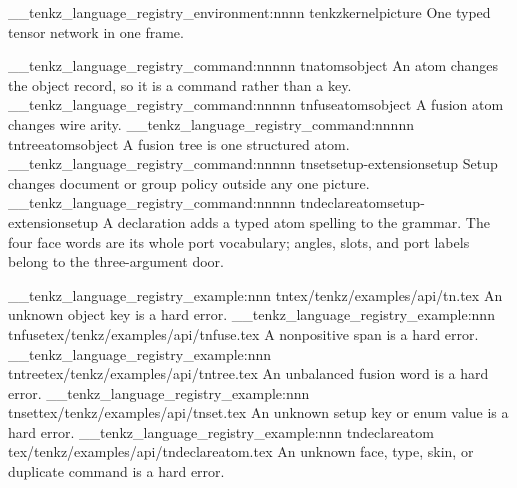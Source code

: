 
\__tenkz_language_registry_environment:nnnn {tenkz}{kernel}{picture}
  {One typed tensor network in one frame.}

\__tenkz_language_registry_command:nnnnn {tn}{atoms}{object}
  {}{An atom changes the object record, so it is a command rather than a key.}
\__tenkz_language_registry_command:nnnnn {tnfuse}{atoms}{object}
  {}{A fusion atom changes wire arity.}
\__tenkz_language_registry_command:nnnnn {tntree}{atoms}{object}
  {}{A fusion tree is one structured atom.}
\__tenkz_language_registry_command:nnnnn {tnset}{setup-extension}{setup}
  {}{Setup changes document or group policy outside any one picture.}
\__tenkz_language_registry_command:nnnnn {tndeclareatom}{setup-extension}{setup}
  {}
  {A declaration adds a typed atom spelling to the grammar. The four face words are its whole port vocabulary; angles, slots, and port labels belong to the three-argument door.}

\__tenkz_language_registry_example:nnn {tn}{tex/tenkz/examples/api/tn.tex}
  {An unknown object key is a hard error.}
\__tenkz_language_registry_example:nnn {tnfuse}{tex/tenkz/examples/api/tnfuse.tex}
  {A nonpositive span is a hard error.}
\__tenkz_language_registry_example:nnn {tntree}{tex/tenkz/examples/api/tntree.tex}
  {An unbalanced fusion word is a hard error.}
\__tenkz_language_registry_example:nnn {tnset}{tex/tenkz/examples/api/tnset.tex}
  {An unknown setup key or enum value is a hard error.}
\__tenkz_language_registry_example:nnn {tndeclareatom}
  {tex/tenkz/examples/api/tndeclareatom.tex}
  {An unknown face, type, skin, or duplicate command is a hard error.}

